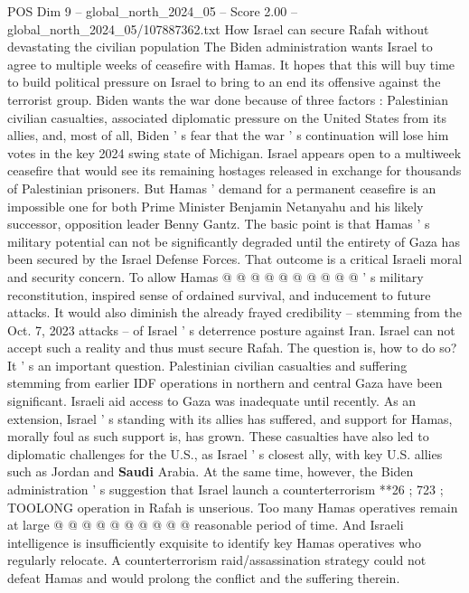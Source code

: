 \begin{textsample}{POS Dim 9 – global\_north\_2024\_05 – Score 2.00 – global\_north\_2024\_05/107887362.txt}  \label{ex:f9_pos_210}
How Israel can secure Rafah without devastating the civilian population The Biden administration wants Israel to agree to multiple weeks of ceasefire with Hamas.
It hopes that this will buy time to build political pressure on Israel to bring to an end its offensive against the terrorist group.
Biden wants the war done because of three factors : Palestinian civilian casualties, associated diplomatic pressure on the United States from its allies, and, most of all, Biden ' s fear that the war ' s continuation will lose him votes in the key 2024 swing state of Michigan.
Israel appears open to a multiweek ceasefire that would see its remaining hostages released in exchange for thousands of Palestinian prisoners.
But Hamas ' demand for a permanent ceasefire is an impossible one for both Prime Minister Benjamin Netanyahu and his likely successor, opposition leader Benny Gantz.
The basic point is that Hamas ' s military potential can not be significantly degraded until the entirety of Gaza has been secured by the Israel Defense Forces.
That outcome is a critical Israeli moral and security concern.
To allow Hamas @ @ @ @ @ @ @ @ @ @ ' s military reconstitution, inspired sense of ordained survival, and inducement to future attacks.
It would also diminish the already frayed credibility -- stemming from the Oct. 7, 2023 attacks -- of Israel ' s deterrence posture against Iran.
Israel can not accept such a reality and thus must secure Rafah.
The question is, how to do so?
It ' s an important question.
Palestinian civilian casualties and suffering stemming from earlier IDF operations in northern and central Gaza have been significant.
Israeli aid access to Gaza was inadequate until recently.
As an extension, Israel ' s standing with its allies has suffered, and support for Hamas, morally foul as such support is, has grown.
These casualties have also led to diplomatic challenges for the U.S., as Israel ' s closest ally, with key U.S. allies such as Jordan and \textbf{Saudi} Arabia.
At the same time, however, the Biden administration ' s suggestion that Israel launch a counterterrorism **26 ; 723 ; TOOLONG operation in Rafah is unserious.
Too many Hamas operatives remain at large @ @ @ @ @ @ @ @ @ @ reasonable period of time.
And Israeli intelligence is insufficiently exquisite to identify key Hamas operatives who regularly relocate.
A counterterrorism raid/assassination strategy could not defeat Hamas and would prolong the conflict and the suffering therein.

\end{textsample}
